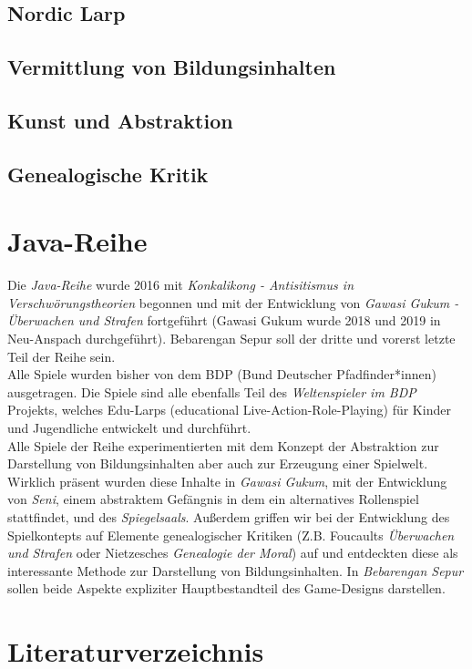 \documentclass[a4paper, 12pt]{scrartcl}
\begin{document}
    \subsection{Nordic Larp} \label{nordic-larp}
    \subsection{Vermittlung von Bildungsinhalten}
    \subsection{Kunst und Abstraktion} \label{kunst-abstraktion}
    \subsection{Genealogische Kritik} \label{genealogische-kritik}

    \section{Java-Reihe} \label{java-reihe}
    Die \textit{Java-Reihe} wurde 2016 mit \textit{Konkalikong - Antisitismus in Verschwörungstheorien} begonnen und mit der Entwicklung von \textit{Gawasi Gukum - Überwachen und Strafen} fortgeführt (Gawasi Gukum wurde 2018 und 2019 in Neu-Anspach durchgeführt).
    Bebarengan Sepur soll der dritte und vorerst letzte Teil der Reihe sein.\\ 
    Alle Spiele wurden bisher von dem BDP (Bund Deutscher Pfadfinder*innen) ausgetragen. 
    Die Spiele sind alle ebenfalls Teil des \textit{Weltenspieler im BDP} Projekts, welches Edu-Larps (educational Live-Action-Role-Playing) für Kinder und Jugendliche entwickelt und durchführt. \\
    Alle Spiele der Reihe experimentierten mit dem Konzept der Abstraktion zur Darstellung von Bildungsinhalten aber auch zur Erzeugung einer Spielwelt. 
    Wirklich präsent wurden diese Inhalte in \textit{Gawasi Gukum}, mit der Entwicklung von \textit{Seni}, einem abstraktem Gefängnis in dem ein alternatives Rollenspiel stattfindet, und des \textit{Spiegelsaals}.
    Außerdem griffen wir bei der Entwicklung des Spielkontepts auf Elemente genealogischer Kritiken (Z.B. Foucaults \textit{Überwachen und Strafen} oder Nietzesches \textit{Genealogie der Moral}) auf und entdeckten diese als interessante Methode zur Darstellung von Bildungsinhalten.
    In \textit{Bebarengan Sepur} sollen beide Aspekte expliziter Hauptbestandteil des Game-Designs darstellen. 

    \section{Literaturverzeichnis}

 

  
\end{document}

